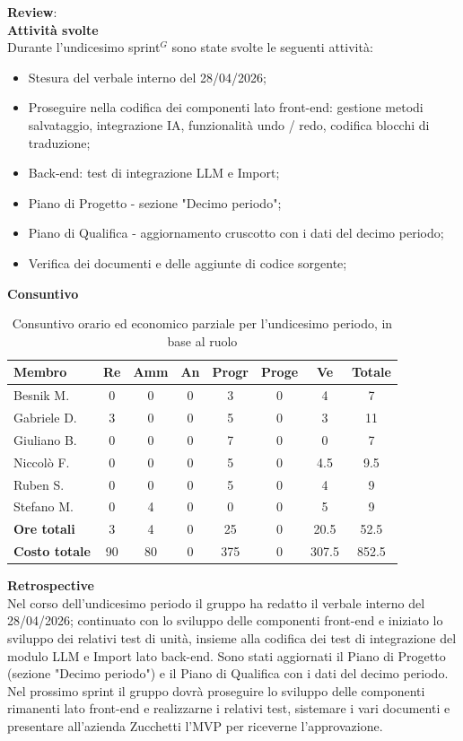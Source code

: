 \documentclass[a4paper,10pt]{article}
\begin{document}
\textbf{Review}: \\
\textbf{Attività svolte}\\
Durante l'undicesimo sprint$^G$ sono state svolte le seguenti attività:
\begin{itemize}
  \item Stesura del verbale interno del 28/04/2026;
  \item Proseguire nella codifica dei componenti lato front-end: gestione metodi salvataggio, integrazione IA, funzionalità undo / redo, codifica blocchi di traduzione;
  \item Back-end: test di integrazione LLM e Import;
  \item Piano di Progetto - sezione "Decimo periodo";
  \item Piano di Qualifica - aggiornamento cruscotto con i dati del decimo periodo;
  \item Verifica dei documenti e delle aggiunte di codice sorgente;
\end{itemize}
\textbf{Consuntivo}
\begin{table}[H]
\centering
\begin{tabular}{|l|c|c|c|c|c|c|c|}
\hline
\textbf{Membro} & \textbf{Re} & \textbf{Amm} & \textbf{An} & \textbf{Progr} & \textbf{Proge} & \textbf{Ve} & \textbf{Totale} \\
\hline
Besnik M.   & 0   & 0   & 0 & 3   & 0 & 4 & 7 \\
Gabriele D. & 3  & 0   & 0 & 5   & 0 & 3  & 11 \\
Giuliano B. & 0   & 0   & 0 & 7   & 0 & 0  & 7 \\
Niccolò F.  & 0   & 0   & 0 & 5   & 0 & 4.5  & 9.5 \\
Ruben S.    & 0 & 0   & 0 & 5   & 0 & 4  & 9 \\
Stefano M.  & 0   & 4   & 0 & 0   & 0 & 5  & 9 \\
\hline
\textbf{Ore totali} & 3  & 4 & 0 & 25  & 0 & 20.5 & 52.5 \\
\hline
\textbf{Costo totale} & 90 & 80 & 0 & 375  & 0  & 307.5 & 852.5 \\
\hline
\end{tabular}
\caption{Consuntivo orario ed economico parziale per l'undicesimo periodo, in base al ruolo}
\end{table}

\textbf{Retrospective} \\
Nel corso dell'undicesimo periodo il gruppo ha redatto il verbale interno del 28/04/2026; continuato con lo sviluppo delle componenti front-end e iniziato lo sviluppo dei relativi test di unità, insieme alla codifica dei test di integrazione del modulo LLM e Import lato back-end. Sono stati aggiornati il Piano di Progetto (sezione "Decimo periodo") e il Piano di Qualifica con i dati del decimo periodo.
Nel prossimo sprint il gruppo dovrà proseguire lo sviluppo delle componenti rimanenti lato front-end e realizzarne i relativi test, sistemare i vari documenti e presentare all'azienda Zucchetti l'MVP per riceverne l'approvazione.
\end{document}
